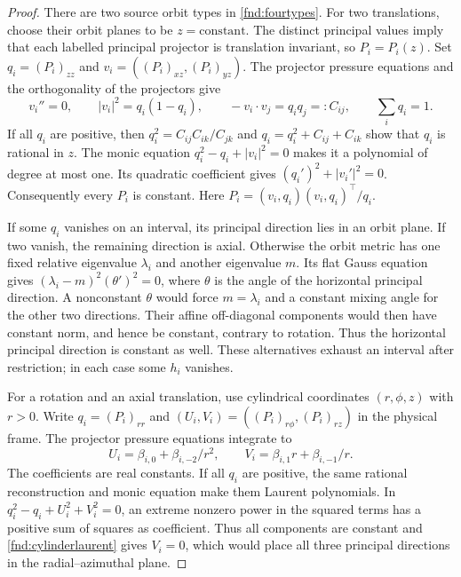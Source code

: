 \documentclass[11pt,a4paper]{article}
\numberwithin{equation}{section}
\theoremstyle{plain}
\theoremstyle{definition}
\theoremstyle{remark}
\begin{document}
\begin{proof}
There are two source orbit types in \eqref{fnd:fourtypes}.
For two translations, choose their orbit planes to be
$z=\mathrm{constant}$. The distinct principal values imply that each
labelled principal projector is translation invariant, so $P_i=P_i(z)$.
Set $q_i=(P_i)_{zz}$ and
$v_i=((P_i)_{xz},(P_i)_{yz})$. The projector pressure equations and
the orthogonality of the projectors give
\begin{equation}\label{fnd:translationprojectors}
v_i''=0,\qquad |v_i|^2=q_i(1-q_i),\qquad
-v_i\cdot v_j=q_iq_j=:C_{ij},\qquad \sum_iq_i=1.
\end{equation}
If all $q_i$ are positive, then
$q_i^2=C_{ij}C_{ik}/C_{jk}$ and
$q_i=q_i^2+C_{ij}+C_{ik}$ show that $q_i$ is rational in $z$.
The monic equation $q_i^2-q_i+|v_i|^2=0$ makes it a polynomial of
degree at most one. Its quadratic coefficient gives
$(q_i')^2+|v_i'|^2=0$. Consequently every $P_i$ is constant.
Here $P_i=(v_i,q_i)(v_i,q_i)^{\top}/q_i$.

If some $q_i$ vanishes on an interval, its principal direction lies
in an orbit plane. If two vanish, the remaining direction is axial.
Otherwise the orbit metric has one fixed relative eigenvalue
$\lambda_i$ and another eigenvalue $m$. Its flat Gauss equation gives
$(\lambda_i-m)^2(\theta')^2=0$, where $\theta$ is the
angle of the horizontal principal direction. A nonconstant $\theta$
would force $m=\lambda_i$ and a constant mixing angle for the other
two directions. Their affine off-diagonal components would then
have constant norm, and hence be constant, contrary to rotation.
Thus the horizontal principal direction is constant as well.
These alternatives exhaust an interval after restriction; in each
case some $h_i$ vanishes.

For a rotation and an axial translation, use cylindrical coordinates
$(r,\phi,z)$ with $r>0$. Write $q_i=(P_i)_{rr}$ and
$(U_i,V_i)=((P_i)_{r\phi},(P_i)_{rz})$ in the physical frame.
The projector pressure equations integrate to
\begin{equation}\label{fnd:cylinderlaurent}
U_i=\beta_{i,0}+\beta_{i,-2}/r^2,\qquad
V_i=\beta_{i,1}r+\beta_{i,-1}/r.
\end{equation}
The coefficients are real constants. If all $q_i$ are positive, the
same rational reconstruction and monic equation make them Laurent
polynomials. In $q_i^2-q_i+U_i^2+V_i^2=0$, an extreme nonzero power
in the squared terms has a positive sum of squares as coefficient.
Thus all components are constant and \eqref{fnd:cylinderlaurent}
gives $V_i=0$, which would place all three principal directions in
the radial--azimuthal plane.


\end{proof}
\end{document}
